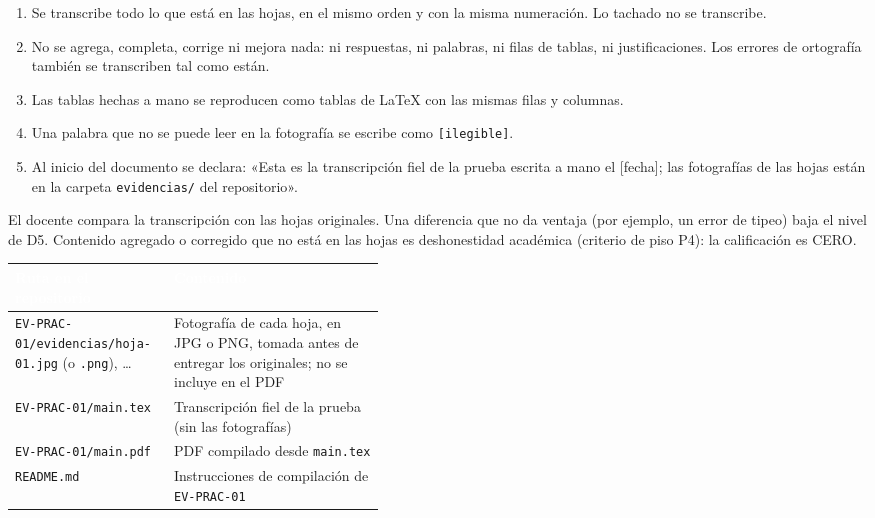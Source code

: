 \documentclass[11pt]{article}
\newcommand{\thdr}[1]{\cellcolor{utegreen}\textcolor{white}{\textbf{#1}}}
\begin{document}
\begin{cajaaviso}[title={Reglas de la transcripción fiel}]
	\begin{enumerate}[label=\textbf{R\arabic*.},leftmargin=24pt,itemsep=2pt]
		\item Se transcribe todo lo que está en las hojas, en el mismo orden y con la misma numeración. Lo tachado no se transcribe.
		\item No se agrega, completa, corrige ni mejora nada: ni respuestas, ni palabras, ni filas de tablas, ni justificaciones. Los errores de ortografía también se transcriben tal como están.
		\item Las tablas hechas a mano se reproducen como tablas de \LaTeX{} con las mismas filas y columnas.
		\item Una palabra que no se puede leer en la fotografía se escribe como \texttt{[ilegible]}.
		\item Al inicio del documento se declara: «Esta es la transcripción fiel de la prueba escrita a mano el [fecha]; las fotografías de las hojas están en la carpeta \texttt{evidencias/} del repositorio».
	\end{enumerate}
	El docente compara la transcripción con las hojas originales. Una diferencia que no da ventaja (por ejemplo, un error de tipeo) baja el nivel de D5. Contenido agregado o corregido que no está en las hojas es deshonestidad académica (criterio de piso P4): la calificación es CERO.
\end{cajaaviso}

\noindent\begin{minipage}{\linewidth}
{\small
\noindent\begin{tabularx}{\linewidth}{|L{0.43\linewidth}|Y|}
	\hline
	\thdr{Ruta en el repositorio} & \thdr{Contenido}\\
	\hline
	\texttt{EV-PRAC-01/\allowbreak{}evidencias/\allowbreak{}hoja-01.jpg} (o \texttt{.png}), \ldots & Fotografía de cada hoja, en JPG o PNG, tomada antes de entregar los originales; no se incluye en el PDF\\
	\hline
	 \texttt{EV-PRAC-01/main.tex} & Transcripción fiel de la prueba (sin las fotografías)\\
	\hline
	\texttt{EV-PRAC-01/main.pdf} & PDF compilado desde \texttt{main.tex}\\
	\hline
	 \texttt{README.md} & Instrucciones de compilación de \texttt{EV-PRAC-01}\\
	\hline
\end{tabularx}
}
\end{minipage}
\end{document}
